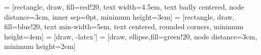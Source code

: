 \documentclass{article}
\begin{document}
\pagestyle{empty}





 = [rectangle, draw, fill=red!20, 
    text width=4.5em, text badly centered, node distance=3cm, inner
    sep=0pt, minimum height=3em]
 = [rectangle, draw, fill=blue!20, 
    text min-width=5em, text centered, rounded corners, minimum height=4em]
 = [draw, -latex']
 = [draw, ellipse,fill=green!20, node distance=3cm,
    minimum height=2em]
    

\end{document}
